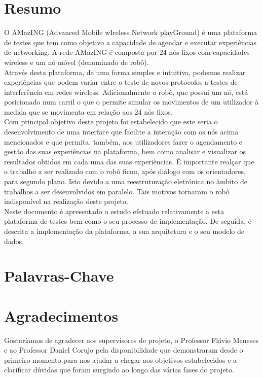 \chapter{Resumo}
O AMazING  (Advanced Mobile wIreless Network playGround) é uma plataforma de testes que tem como objetivo a capacidade de agendar e executar experiências de networking. A rede AMazING é composta por 24 nós fixos com capacidades wireless e um nó móvel (denominado de robô). \newline\\
Através desta plataforma, de uma forma simples e intuitiva, podemos realizar experiências que podem variar entre o teste de novos protocolos a testes de interferência em redes wireless. Adicionalmente o robô, que possui um nó, está posicionado num carril o que o permite simular os movimentos de um utilizador à medida que se  movimenta em relação aos 24 nós fixos. \newline\\
Com principal objetivo deste projeto foi estabelecido que este seria o desenvolvimento de uma interface que facilite a interação com os nós acima mencionados e que permita, também, aos utilizadores fazer o agendamento e gestão das suas experiências na plataforma, bem como analisar e visualizar os resultados obtidos em cada uma das suas experiências. É importante realçar que o trabalho a ser realizado com o robô ficou, após diálogo com os orientadores, para segundo plano. Isto devido a uma reestruturação eletrónica no âmbito de trabalhos a ser desenvolvidos em paralelo. Tais motivos tornaram o robô indisponível na realização deste projeto.\newline\\
Neste documento é apresentado o estudo efetuado relativamente a esta plataforma de testes bem como o seu processo de implementação. De seguida, é descrita a implementação da plataforma, a sua arquitetura e o seu modelo de dados.


\chapter{Palavras-Chave}
\begin{acronym}[Keys]
\end{acronym}

\chapter{Agradecimentos}
Gostaríamos de agradecer aos supervisores de projeto, o Professor Flávio Meneses e ao Professor Daniel Corujo pela disponibilidade que demonstraram desde o primeiro momento para nos  ajudar a chegar aos objetivos estabelecidos e a clarificar dúvidas que foram surgindo ao longo das várias fases do projeto.

